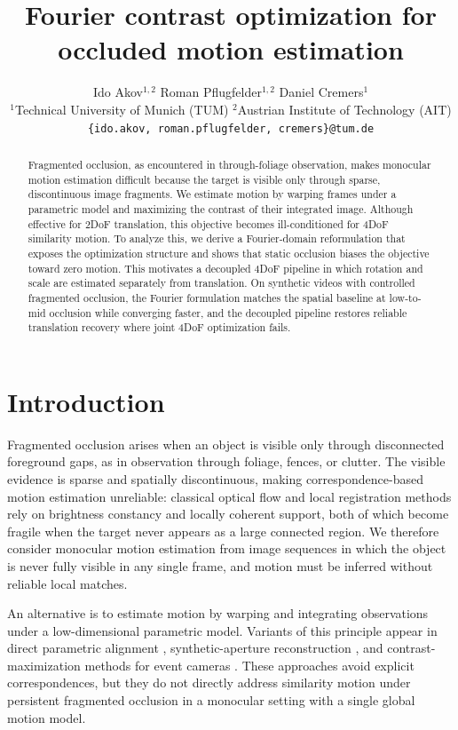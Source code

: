 \documentclass{article}
\title{Fourier contrast optimization for occluded motion estimation}
\author{%
Ido Akov$^{1,2}$ \And Roman Pflugfelder$^{1,2}$ \And Daniel Cremers$^{1}$\\
$^{1}$Technical University of Munich (TUM)\quad
$^{2}$Austrian Institute of Technology (AIT)\\
\texttt{\{ido.akov, roman.pflugfelder, cremers\}@tum.de}
}
\begin{document}
\maketitle
\begin{abstract}
Fragmented occlusion, as encountered in through-foliage observation, makes monocular motion estimation difficult because the target is visible only through sparse, discontinuous image fragments. We estimate motion by warping frames under a parametric model and maximizing the contrast of their integrated image. Although effective for 2DoF translation, this objective becomes ill-conditioned for 4DoF similarity motion. To analyze this, we derive a Fourier-domain reformulation that exposes the optimization structure and shows that static occlusion biases the objective toward zero motion. This motivates a decoupled 4DoF pipeline in which rotation and scale are estimated separately from translation. On synthetic videos with controlled fragmented occlusion, the Fourier formulation matches the spatial baseline at low-to-mid occlusion while converging faster, and the decoupled pipeline restores reliable translation recovery where joint 4DoF optimization fails.
\end{abstract}

\section{Introduction}
Fragmented occlusion \cite{pegoraro2020} arises when an object is visible only through disconnected foreground gaps, as in observation through foliage, fences, or clutter. The visible evidence is sparse and spatially discontinuous, making correspondence-based motion estimation unreliable: classical optical flow and local registration methods \cite{LucasKanade,horn1981optical,black1996robust} rely on brightness constancy and locally coherent support, both of which become fragile when the target never appears as a large connected region. We therefore consider monocular motion estimation from image sequences in which the object is never fully visible in any single frame, and motion must be inferred without reliable local matches.

An alternative is to estimate motion by warping and integrating observations under a low-dimensional parametric model. Variants of this principle appear in direct parametric alignment \cite{irani1992}, synthetic-aperture reconstruction \cite{vaish2006cvpr}, and contrast-maximization methods for event cameras \cite{Gallego_2018}. These approaches avoid explicit correspondences, but they do not directly address similarity motion under persistent fragmented occlusion in a monocular setting with a single global motion model.
\end{document}
